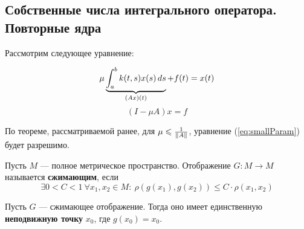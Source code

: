 \documentclass[12pt]{article}
\begin{document}
	\subsection{Собственные числа интегрального оператора. Повторные ядра}
	
		Рассмотрим следующее уравнение:
	
		\begin{equation*}	
			\mu \underbrace{\int_a^b k(t,s) x(s)\,ds}_{(Ax)(t)} + f(t) = x(t) \\		
		\end{equation*}
		\begin{equation}
			(I - \mu A)x = f \label{eq:smallParam}
		\end{equation}
	
		По теореме, рассматриваемой ранее, для $\mu \leqslant \frac{1}{\left\| A \right\|}$, уравнение (\ref{eq:smallParam}) будет разрешимо.
	
		\begin{defi}
			Пусть $M$ --- полное метрическое пространство. Отображение $G: M\rightarrow M$ называется \textbf{сжимающим}, если
			$$\exists 0 < C < 1 \: \forall x_1,x_2 \in M\!\!:\: \rho(g(x_1), g(x_2)) \leq C\cdot\rho(x_1,x_2)$$
		\end{defi}
	
		\begin{theorem} \label{th:CompFunc}
			Пусть $G$ --- сжимающее отображение. Тогда оно имеет единственную \textbf{неподвижную точку} $x_0$, где $g(x_0) = x_0$.
		\end{theorem}
	
\end{document}
